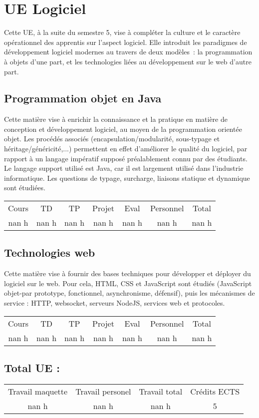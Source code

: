 \section{UE Logiciel}%
\label{sec:UELogiciel}%
Cette UE, à la suite du semestre 5, vise à compléter la culture et le caractère opérationnel des apprentis sur l'aspect logiciel. Elle introduit les paradigmes de développement logiciel modernes au travers de deux modèles~: la programmation à objets d’une part, et les technologies liées au développement sur le web d’autre part.%
\subsection{Programmation objet en Java}%
\label{subsec:ProgrammationobjetenJava}%

%
Cette matière vise à enrichir la connaissance et la pratique en matière de conception et développement logiciel, au moyen de la programmation orientée objet. Les procédés associés (encapsulation/modularité, sous{-}typage et héritage/généricité,...) permettent en effet d'améliorer le qualité du logiciel, par rapport à un langage impératif supposé préalablement connu par des étudiants. Le langage support utilisé est Java, car il est largement utilisé dans l'industrie informatique. Les questions de typage, surcharge, liaisons statique et dynamique sont étudiées.%
\begin{longtable}{c c c c c c c}%
\hline%
Cours&TD&TP&Projet&Eval&Personnel&Total\\%
nan h&nan h&nan h&nan h&nan h&nan h&nan h\\%
\hline%
\end{longtable}%
\subsection{Technologies web}%
\label{subsec:Technologiesweb}%

%
Cette matière vise à fournir des bases techniques pour développer et déployer du logiciel sur le web. Pour cela, HTML, CSS et JavaScript sont étudiés (JavaScript objet{-}par prototype, fonctionnel, asynchronisme, défensif), puis les mécanismes de service : HTTP, websocket, serveurs NodeJS, services web et protocoles.  %
\begin{longtable}{c c c c c c c}%
\hline%
Cours&TD&TP&Projet&Eval&Personnel&Total\\%
nan h&nan h&nan h&nan h&nan h&nan h&nan h\\%
\hline%
\end{longtable}%
\subsection{Total UE :}%
\label{subsec:TotalUE}%

%
\begin{longtable}{c c c c}%
\hline%
Travail maquette&Travail personel&Travail total&Crédits ECTS\\%
nan h&nan h&nan h&5\\%
\hline%
\end{longtable}